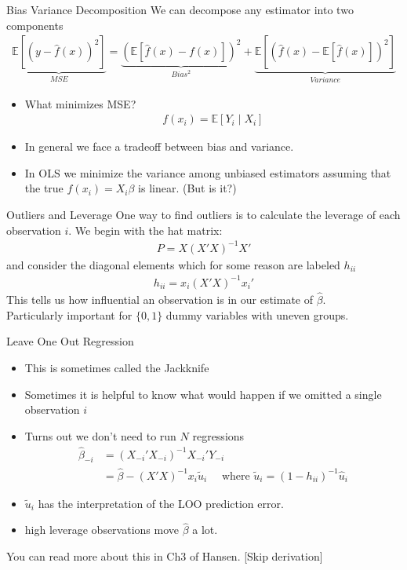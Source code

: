 \documentclass[aspectratio=169]{beamer}
\begin{document}
\begin{frame}{Bias Variance Decomposition}
We can decompose any estimator into two components
\begin{eqnarray*}
\underbrace{\mathbb{E}[(y- \hat{f}(x))^2]}_{MSE} =\underbrace{\left( \mathbb{E}[ \hat{f}(x) - f(x)] \right)^2}_{Bias^2}  +  \underbrace{\mathbb{E} \left[ \left(  \hat{f}(x) - \mathbb{E}[\hat{f}(x)]  \right)^2 \right]}_{Variance} 
\end{eqnarray*}
\begin{itemize}
\item What minimizes MSE?
\begin{eqnarray*}
f(x_i) = \mathbb{E}[Y_i \mid X_i]  
\end{eqnarray*}
\item In general we face a tradeoff between bias and variance.
\item In OLS we minimize the variance among unbiased estimators assuming that the true $f(x_i)= X_i \beta$ is linear. (But is it?)
\end{itemize}
\end{frame}



\begin{frame}{Outliers and Leverage}
One way to find \alert{outliers} is to calculate the \alert{leverage} of each observation $i$. We begin with the \alert{hat matrix}:
\begin{align*}
P = X  (X'X)^{-1} X'
\end{align*}
and consider the diagonal elements which for some reason are labeled $h_{ii}$
\begin{align*}
h_{ii} = x_i (X'X)^{-1} x_i'
\end{align*}
This tells us how \alert{influential} an observation is in our estimate of $\widehat{\beta}$.\\
Particularly important for $\{0,1\}$ \alert{dummy variables} with uneven groups.
\end{frame}


\begin{frame}{Leave One Out Regression}
\begin{itemize}
\item This is sometimes called the \alert{Jackknife}
\item Sometimes it is helpful to know what would happen if we omitted a single observation $i$
\item Turns out we don't need to run $N$ regressions
\begin{align*}
\widehat{\beta}_{-i} &= (X_{-i}'X_{-i})^{-1} X_{-i}' Y_{-i} \\
&=\widehat{\beta} -  (X 'X)^{-1} x_i  \tilde{u}_i  \quad \mbox{ where } \tilde{u}_i = (1-h_{ii})^{-1}\hat{u}_i
\end{align*}
\item $\tilde{u}_i $ has the interpretation of the \alert{LOO prediction error}.
\item high leverage observations move $\widehat{\beta}$ a lot.
\end{itemize}
You can read more about this in Ch3 of Hansen. [Skip derivation]
\end{frame}
\end{document}
